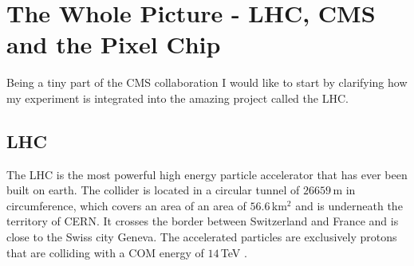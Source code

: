 \documentclass[british,11pt,a4paper]{memoir}
\begin{document}
\chapter{The Whole Picture - LHC, CMS and the Pixel Chip}
Being a tiny part of the \ac{CMS} collaboration I would like to start by clarifying how my experiment is integrated into the amazing project called the \ac{LHC}.
\section{\ac{LHC}}
The LHC is the most powerful high energy particle accelerator that has ever been built on earth. The collider is located in a circular tunnel of $26659\,$m in circumference, which covers an area of an area of $56.6\,$km$^{2}$ and is underneath the territory of \ac{CERN}. It crosses the border between Switzerland and France and is close to the Swiss city Geneva. The accelerated particles are exclusively protons that are colliding with a \ac{COM} energy of $14\,$TeV \cite{lhc}.
\end{document}
